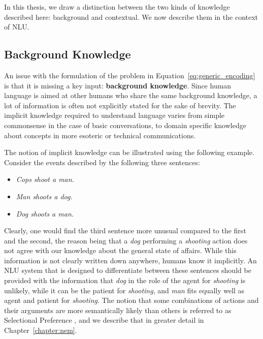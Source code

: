 In this thesis, we draw a distinction between the two kinds of knowledge described here: background and contextual. We now describe them in the context of NLU.

\subsection{Background Knowledge}
An issue with the formulation of the problem in Equation~\ref{eq:generic_encoding} is that it is missing a key input: \textbf{background knowledge}. 
Since human language is aimed at other humans who share 
the same background knowledge, a lot of information is often not explicitly stated
for the sake of brevity. The implicit knowledge required to understand language varies 
from simple commonsense in the case of basic conversations, to domain specific knowledge
about concepts in more esoteric or technical communications.

The notion of implicit knowledge can be illustrated using the following example. Consider the
events described by the following three sentences:

\begin{itemize}
 \item[] \textit{Cops shoot a man.}
 \item[] \textit{Man shoots a dog.}
 \item[] \textit{Dog shoots a man.}
\end{itemize}

Clearly, one would find the third sentence more unusual compared to the first and the second, the reason being that
a \emph{dog} performing a \emph{shooting} action does not agree with our knowledge about the general state
of affairs. While this information is not clearly written down anywhere, humans know it implicitly. An NLU
system that is designed to differentiate between these sentences should be provided with the information
that \emph{dog} in the role of the agent for \emph{shooting} is unlikely, while it can be the patient for
\emph{shooting}, and \emph{man} fits equally well as agent and patient for \emph{shooting}. The notion that
some combinations of actions and their arguments are more semantically likely than others is referred to as
Selectional Preference \citep{wilks1973preference}, and we describe that in greater detail in Chapter~\ref{chapter:nem}.

